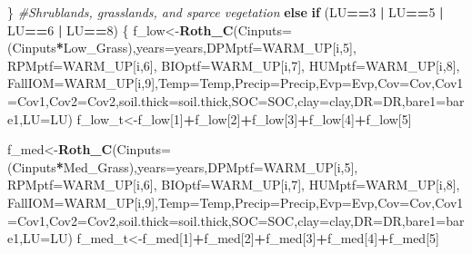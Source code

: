 \documentclass[
  10pt,
  b5paper,
]{book}
\newenvironment{Shaded}{\begin{snugshade}}{\end{snugshade}}
\newcommand{\CommentTok}[1]{\textcolor[rgb]{0.56,0.35,0.01}{\textit{#1}}}
\newcommand{\ControlFlowTok}[1]{\textcolor[rgb]{0.13,0.29,0.53}{\textbf{#1}}}
\newcommand{\DataTypeTok}[1]{\textcolor[rgb]{0.13,0.29,0.53}{#1}}
\newcommand{\DecValTok}[1]{\textcolor[rgb]{0.00,0.00,0.81}{#1}}
\newcommand{\KeywordTok}[1]{\textcolor[rgb]{0.13,0.29,0.53}{\textbf{#1}}}
\newcommand{\NormalTok}[1]{#1}
\newcommand{\OperatorTok}[1]{\textcolor[rgb]{0.81,0.36,0.00}{\textbf{#1}}}
\newcommand{\StringTok}[1]{\textcolor[rgb]{0.31,0.60,0.02}{#1}}
\begin{document}
\begin{Shaded}
\begin{Highlighting}[]
{\NormalTok{\}}
\CommentTok{#Shrublands, grasslands, and sparce vegetation}
\ControlFlowTok{else} \ControlFlowTok{if}\NormalTok{ (LU}\OperatorTok{==}\DecValTok{3} \OperatorTok{|}\StringTok{ }\NormalTok{LU}\OperatorTok{==}\DecValTok{5} \OperatorTok{|}\StringTok{ }\NormalTok{LU}\OperatorTok{==}\DecValTok{6} \OperatorTok{|}\StringTok{ }\NormalTok{LU}\OperatorTok{==}\DecValTok{8}\NormalTok{) \{}
\NormalTok{f_low<-}\KeywordTok{Roth_C}\NormalTok{(}\DataTypeTok{Cinputs=}\NormalTok{(Cinputs}\OperatorTok{*}\NormalTok{Low_Grass),}\DataTypeTok{years=}\NormalTok{years,}\DataTypeTok{DPMptf=}\NormalTok{WARM_UP[i,}\DecValTok{5}\NormalTok{], }\DataTypeTok{RPMptf=}\NormalTok{WARM_UP[i,}\DecValTok{6}\NormalTok{], }\DataTypeTok{BIOptf=}\NormalTok{WARM_UP[i,}\DecValTok{7}\NormalTok{], }\DataTypeTok{HUMptf=}\NormalTok{WARM_UP[i,}\DecValTok{8}\NormalTok{], }\DataTypeTok{FallIOM=}\NormalTok{WARM_UP[i,}\DecValTok{9}\NormalTok{],}\DataTypeTok{Temp=}\NormalTok{Temp,}\DataTypeTok{Precip=}\NormalTok{Precip,}\DataTypeTok{Evp=}\NormalTok{Evp,}\DataTypeTok{Cov=}\NormalTok{Cov,}\DataTypeTok{Cov1=}\NormalTok{Cov1,}\DataTypeTok{Cov2=}\NormalTok{Cov2,}\DataTypeTok{soil.thick=}\NormalTok{soil.thick,}\DataTypeTok{SOC=}\NormalTok{SOC,}\DataTypeTok{clay=}\NormalTok{clay,}\DataTypeTok{DR=}\NormalTok{DR,}\DataTypeTok{bare1=}\NormalTok{bare1,}\DataTypeTok{LU=}\NormalTok{LU)}
\NormalTok{f_low_t<-f_low[}\DecValTok{1}\NormalTok{]}\OperatorTok{+}\NormalTok{f_low[}\DecValTok{2}\NormalTok{]}\OperatorTok{+}\NormalTok{f_low[}\DecValTok{3}\NormalTok{]}\OperatorTok{+}\NormalTok{f_low[}\DecValTok{4}\NormalTok{]}\OperatorTok{+}\NormalTok{f_low[}\DecValTok{5}\NormalTok{]}

\NormalTok{f_med<-}\KeywordTok{Roth_C}\NormalTok{(}\DataTypeTok{Cinputs=}\NormalTok{(Cinputs}\OperatorTok{*}\NormalTok{Med_Grass),}\DataTypeTok{years=}\NormalTok{years,}\DataTypeTok{DPMptf=}\NormalTok{WARM_UP[i,}\DecValTok{5}\NormalTok{], }\DataTypeTok{RPMptf=}\NormalTok{WARM_UP[i,}\DecValTok{6}\NormalTok{], }\DataTypeTok{BIOptf=}\NormalTok{WARM_UP[i,}\DecValTok{7}\NormalTok{], }\DataTypeTok{HUMptf=}\NormalTok{WARM_UP[i,}\DecValTok{8}\NormalTok{], }\DataTypeTok{FallIOM=}\NormalTok{WARM_UP[i,}\DecValTok{9}\NormalTok{],}\DataTypeTok{Temp=}\NormalTok{Temp,}\DataTypeTok{Precip=}\NormalTok{Precip,}\DataTypeTok{Evp=}\NormalTok{Evp,}\DataTypeTok{Cov=}\NormalTok{Cov,}\DataTypeTok{Cov1=}\NormalTok{Cov1,}\DataTypeTok{Cov2=}\NormalTok{Cov2,}\DataTypeTok{soil.thick=}\NormalTok{soil.thick,}\DataTypeTok{SOC=}\NormalTok{SOC,}\DataTypeTok{clay=}\NormalTok{clay,}\DataTypeTok{DR=}\NormalTok{DR,}\DataTypeTok{bare1=}\NormalTok{bare1,}\DataTypeTok{LU=}\NormalTok{LU)}
\NormalTok{f_med_t<-f_med[}\DecValTok{1}\NormalTok{]}\OperatorTok{+}\NormalTok{f_med[}\DecValTok{2}\NormalTok{]}\OperatorTok{+}\NormalTok{f_med[}\DecValTok{3}\NormalTok{]}\OperatorTok{+}\NormalTok{f_med[}\DecValTok{4}\NormalTok{]}\OperatorTok{+}\NormalTok{f_med[}\DecValTok{5}\NormalTok{]}

}
\end{Highlighting}
\end{Shaded}
\end{document}
